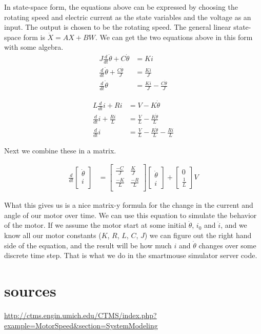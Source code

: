 \documentclass{article}
\begin{document}
In state-space form, the equations above can be expressed by choosing the rotating speed and electric current as the state variables and the voltage as an input. The output is chosen to be the rotating speed. The general linear state-space form is $\dot{X} = AX + BW$. We can get the two equations above in this form with some algebra.
\begin{align}
  J\frac{d}{dt}\dot{\theta} + C\dot{\theta} &= Ki \\
  \frac{d}{dt}\dot{\theta} + \frac{C\dot{\theta}}{J} &= \frac{Ki}{J} \\
  \frac{d}{dt}\dot{\theta} &= \frac{Ki}{J} - \frac{C\dot{\theta}}{J}
\end{align}

\begin{align}
  L\frac{d}{dt}i + Ri &= V - K\dot{\theta} \\
  \frac{d}{dt}i + \frac{Ri}{L} &= \frac{V}{L} - \frac{K\dot{\theta}}{L} \\
  \frac{d}{dt}i &= \frac{V}{L} - \frac{K\dot{\theta}}{L} - \frac{Ri}{L}
\end{align}

Next we combine these in a matrix.

\begin{align}
  \frac{d}{dt}\begin{bmatrix}\dot{\theta}\\i\\\end{bmatrix} &=
    \begin{bmatrix}
      \frac{-C}{J} & \frac{K}{J} \\
      \frac{-K}{L} & \frac{-R}{L} \\
    \end{bmatrix}
    \begin{bmatrix}
      \dot{\theta} \\
      i
    \end{bmatrix}
    +
    \begin{bmatrix}
      0 \\
      \frac{1}{L}
    \end{bmatrix}
    V
\end{align}

What this gives us is a nice matrix-y formula for the change in the current and angle of our motor over time. We can use this equation to simulate the behavior of the motor. If we assume the motor start at some initial $\dot{\theta}$, $i_0$ and $\dot{i}$, and we know all our motor constants ($K$, $R$, $L$, $C$, $J$) we can figure out the right hand side of the equation, and the result will be how much $i$ and $\dot{\theta}$ changes over some discrete time step. That is what we do in the smartmouse simulator server code.

\section{sources}
\url{http://ctms.engin.umich.edu/CTMS/index.php?example=MotorSpeed&section=SystemModeling}
\end{document}
